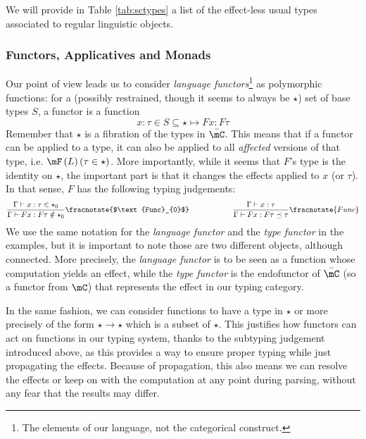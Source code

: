 \documentclass[math, english, info]{cours}
\begin{document}
We will provide in Table \ref{tab:sctypes} a list of the effect-less usual types associated to regular linguistic objects.

\subsubsection{Functors, Applicatives and Monads}\label{subsubsec:functors}
Our point of view leads us to consider \emph{language functors}\footnote{The elements of our language, not the categorical construct.} as polymorphic functions: for a (possibly restrained, though it seems to always be $\star$) set of base types $S$, a functor is a function
\begin{equation*}
	x: \tau\in S\subseteq \star \mapsto F x: F\tau
\end{equation*}
Remember that $\star$ is a fibration of the types in $\bar{\mC}$.
This means that if a functor can be applied to a type, it can also be applied to all \emph{affected} versions of that type, i.e. $\mF\left( L \right)(\tau\in \star)$.
More importantly, while it seems that $F$'s type is the identity on $\star$, the important part is that it changes the effects applied to $x$ (or $\tau$).
In that sense, $F$ has the following typing judgements:
\begin{equation*}
	\frac{\Gamma\vdash x: \tau \in \star_{0}}{\Gamma\vdash F x: F\tau \notin \star_{0}}\fracnotate{$\text{Func}_{0}$} \hspace{2cm} \frac{\Gamma\vdash x: \tau}{\Gamma\vdash Fx : F\tau\preceq \tau}\fracnotate{Func}
\end{equation*}
We use the same notation for the \emph{language functor} and the \emph{type functor} in the examples, but it is important to note those are two different objects, although connected.
More precisely, the \emph{language functor} is to be seen as a function whose computation yields an effect, while the \emph{type functor} is the endofunctor of $\bar{\mC}$ (so a functor from $\mC$) that represents the effect in our typing category.

In the same fashion, we can consider functions to have a type in $\star$ or more precisely of the form $\star \to \star$ which is a subset of $\star$.
This justifies how functors can act on functions in our typing system, thanks to the subtyping judgement introduced above, as this provides a way to ensure proper typing while just propagating the effects.
Because of propagation, this also means we can resolve the effects or keep on with the computation at any point during parsing, without any fear that the results may differ.
\end{document}
